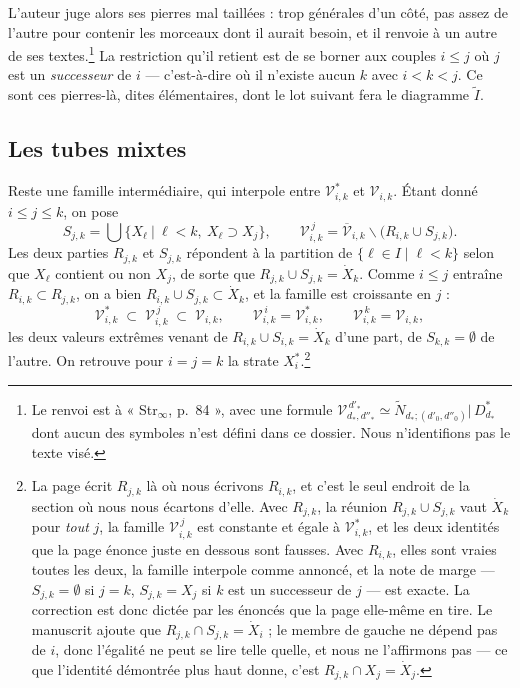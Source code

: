 \documentclass[11pt,a4paper]{article}
\begin{document}
L'auteur juge alors ses pierres mal taillées : trop générales d'un côté, pas
assez de l'autre pour contenir les morceaux dont il aurait besoin, et il renvoie
à un autre de ses textes.\footnote{Le renvoi est à « Str$_{\infty}$, p.~84 »,
avec une formule $\mathcal{V}^{\,d'_{*}}_{d_{*},d''_{*}} \simeq
\widetilde{N}_{d_{*};(d'_{0},d''_{0})}|\,D^{*}_{d_{*}}$ dont aucun des symboles
n'est défini dans ce dossier. Nous n'identifions pas le texte visé.} La
restriction qu'il retient est de se borner aux couples $i \leq j$ où $j$ est un
\emph{successeur} de $i$ — c'est-à-dire où il n'existe aucun $k$ avec
$i < k < j$. Ce sont ces pierres-là, dites élémentaires, dont le lot suivant
fera le diagramme $\widetilde{I}$.

\subsection*{Les tubes mixtes}

Reste une famille intermédiaire, qui interpole entre $\mathcal{V}^{*}_{i,k}$ et
$\mathcal{V}_{i,k}$. Étant donné $i \leq j \leq k$, on pose
\[
  S_{j,k} = \bigcup \bigl\{ X_{\ell} \ \big|\ \ell < k,\ X_{\ell} \supset X_{j} \bigr\},
  \qquad
  \mathcal{V}^{\,j}_{i,k}
  = \overline{\mathcal{V}}_{i,k} \smallsetminus \bigl( R_{i,k} \cup S_{j,k} \bigr).
\]
Les deux parties $R_{j,k}$ et $S_{j,k}$ répondent à la partition de
$\{\ell \in I \mid \ell < k\}$ selon que $X_{\ell}$ contient ou non $X_{j}$, de
sorte que $R_{j,k} \cup S_{j,k} = \dot{X}_{k}$. Comme $i \leq j$ entraîne
$R_{i,k} \subset R_{j,k}$, on a bien $R_{i,k} \cup S_{j,k} \subset \dot{X}_{k}$,
et la famille est croissante en $j$ :
\[
  \mathcal{V}^{*}_{i,k} \;\subset\; \mathcal{V}^{\,j}_{i,k}
  \;\subset\; \mathcal{V}_{i,k},
  \qquad
  \mathcal{V}^{\,i}_{i,k} = \mathcal{V}^{*}_{i,k}, \qquad
  \mathcal{V}^{\,k}_{i,k} = \mathcal{V}_{i,k},
\]
les deux valeurs extrêmes venant de $R_{i,k} \cup S_{i,k} = \dot{X}_{k}$ d'une
part, de $S_{k,k} = \emptyset$ de l'autre. On retrouve pour $i = j = k$ la strate
$X_{i}^{*}$.\footnote{La page écrit $R_{j,k}$ là où nous écrivons $R_{i,k}$, et
c'est le seul endroit de la section où nous nous écartons d'elle. Avec
$R_{j,k}$, la réunion $R_{j,k} \cup S_{j,k}$ vaut $\dot{X}_{k}$ pour \emph{tout}
$j$, la famille $\mathcal{V}^{\,j}_{i,k}$ est constante et égale à
$\mathcal{V}^{*}_{i,k}$, et les deux identités que la page énonce juste en
dessous sont fausses. Avec $R_{i,k}$, elles sont vraies toutes les deux, la
famille interpole comme annoncé, et la note de marge — $S_{j,k} = \emptyset$ si
$j = k$, $S_{j,k} = X_{j}$ si $k$ est un successeur de $j$ — est exacte. La
correction est donc dictée par les énoncés que la page elle-même en tire. Le
manuscrit ajoute que $R_{j,k} \cap S_{j,k} = \dot{X}_{i}$ ; le membre de gauche
ne dépend pas de $i$, donc l'égalité ne peut se lire telle quelle, et nous ne
l'affirmons pas — ce que l'identité démontrée plus haut donne, c'est
$R_{j,k} \cap X_{j} = \dot{X}_{j}$.}
\end{document}
